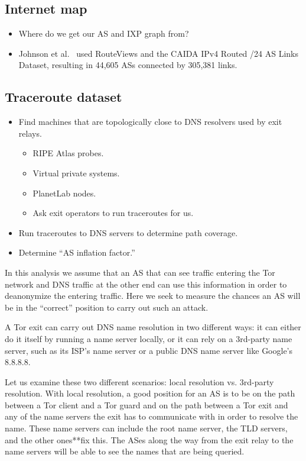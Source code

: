 \subsection{Internet map}
\begin{itemize}
	\item Where do we get our AS and IXP graph from?
	\item Johnson et al.~\cite[\S 5.2]{Johnson2013a} used RouteViews and the CAIDA IPv4
		Routed /24 AS Links Dataset, resulting in 44,605 ASs connected by
		305,381 links.
\end{itemize}

\subsection{Traceroute dataset}
\label{sec:traceroute-dataset}
\begin{itemize}
	\item Find machines that are topologically close to DNS resolvers
		used by exit relays.
	\begin{itemize}
		\item RIPE Atlas probes.
		\item Virtual private systems.
		\item PlanetLab nodes.
		\item Ask exit operators to run traceroutes for us.
	\end{itemize}
	\item Run traceroutes to DNS servers to determine path coverage.
	\item Determine ``AS inflation factor.''
\end{itemize}

In this analysis we assume that an AS that can see traffic entering the Tor network and 
DNS traffic at the other end can use this information in order to deanonymize the 
entering traffic. Here we seek to measure the chances an AS will be in the ``correct'' 
position to carry out such an attack.

A Tor exit can carry out DNS name resolution in two different ways: it can either do it
itself by running a name server locally, or it can rely on a 3rd-party name server, 
such as its ISP's name server or a public DNS name server like Google's 8.8.8.8.

Let us examine these two different scenarios: local resolution vs. 3rd-party 
resolution. With local resolution, a good position for an AS is to be on the path between 
a Tor client and a Tor guard and on the path between a Tor exit and any of the name 
servers the exit has to communicate with in order to resolve the name. These name servers 
can include the root name server, the TLD servers, and the other ones**fix this. The ASes 
along the way from the exit relay to the name servers will be able to see the names that 
are being queried.

